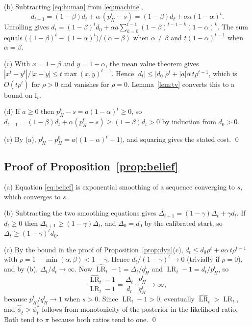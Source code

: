 \documentclass[11pt]{article}
\theoremstyle{plain}
\theoremstyle{definition}
\theoremstyle{remark}
\newcommand{\I}{\mathrm{I}}
\newcommand{\LR}{\operatorname{LR}}
\newcommand{\LRh}{\widehat{\operatorname{LR}}}
\begin{document}
(b) Subtracting \eqref{eq:human} from \eqref{eq:machine},
\[
d_{t+1}=(1-\beta)d_t+\alpha\,(p_H^t-s)=(1-\beta)d_t+\alpha a(1-\alpha)^t.
\]
Unrolling gives $d_t=(1-\beta)^td_0+\alpha a\sum_{k=0}^{t-1}(1-\beta)^{t-1-k}(1-\alpha)^k$. The sum equals $\bigl((1-\beta)^t-(1-\alpha)^t\bigr)/(\alpha-\beta)$ when $\alpha\ne\beta$ and $t(1-\alpha)^{t-1}$ when $\alpha=\beta$.

(c) With $x=1-\beta$ and $y=1-\alpha$, the mean value theorem gives $|x^t-y^t|/|x-y|\le t\max(x,y)^{t-1}$. Hence $|d_t|\le|d_0|\rho^t+|a|\alpha\,t\rho^{t-1}$, which is $O(t\rho^t)$ for $\rho>0$ and vanishes for $\rho=0$. Lemma~\ref{lem:tv} converts this to a bound on $\I_t$.

(d) If $a\ge0$ then $p_H^t-s=a(1-\alpha)^t\ge0$, so $d_{t+1}=(1-\beta)d_t+\alpha(p_H^t-s)\ge(1-\beta)d_t>0$ by induction from $d_0>0$.

(e) By (a), $p_H^t-p_H^0=a\bigl((1-\alpha)^t-1\bigr)$, and squaring gives the stated cost. \qed

\subsection{Proof of Proposition~\ref{prop:belief}}

(a) Equation \eqref{eq:belief} is exponential smoothing of a sequence converging to $s$, which converges to $s$.

(b) Subtracting the two smoothing equations gives $\Delta_{t+1}=(1-\gamma)\Delta_t+\gamma d_t$. If $d_t\ge0$ then $\Delta_{t+1}\ge(1-\gamma)\Delta_t$, and $\Delta_0=d_0$ by the calibrated start, so $\Delta_t\ge(1-\gamma)^td_0$.

(c) By the bound in the proof of Proposition~\ref{prop:dyn}(c), $d_t\le d_0\rho^t+a\alpha\,t\rho^{t-1}$ with $\rho=1-\min(\alpha,\beta)<1-\gamma$. Hence $d_t/(1-\gamma)^t\to0$ (trivially if $\rho=0$), and by (b), $\Delta_t/d_t\to\infty$. Now $\LRh_t-1=\Delta_t/q_H^t$ and $\LR_t-1=d_t/p_H^t$, so
\[
\frac{\LRh_t-1}{\LR_t-1}=\frac{\Delta_t}{d_t}\cdot\frac{p_H^t}{q_H^t}\longrightarrow\infty,
\]
because $p_H^t/q_H^t\to1$ when $s>0$. Since $\LR_t-1>0$, eventually $\LRh_t>\LR_t$, and $\hat\phi_t>\phi^\ast_t$ follows from monotonicity of the posterior in the likelihood ratio. Both tend to $\pi$ because both ratios tend to one. \qed
\end{document}
